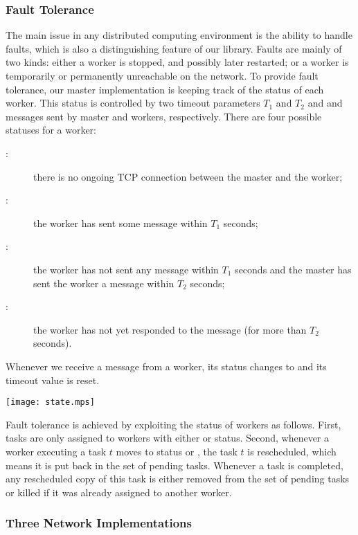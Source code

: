 \documentclass[a4paper,12pt]{article}
\begin{document}
\subsubsection{Fault Tolerance}\label{sec:fault}

The main issue in any distributed computing environment is the ability
to handle faults, which is also a distinguishing feature of our
library.  Faults are mainly of two kinds: either a worker is stopped,
and possibly later restarted; or a worker is temporarily or
permanently unreachable on the network. To provide fault tolerance,
our master implementation is keeping track of the status of each
worker.  This status is controlled by two timeout parameters $T_1$ and
$T_2$ and  and  messages sent by master and workers,
respectively. There are four possible statuses for a worker:
\begin{description}
\item[:] there is no ongoing TCP connection between
  the master and the worker;
\item[:] the worker has sent some message
  within $T_1$ seconds;
\item[:] the worker has not sent any message within $T_1$
  seconds and the master has sent the worker a
   message within $T_2$ seconds;
\item[:] the worker has not yet responded to the 
  message (for more than $T_2$ seconds).
\end{description}
Whenever we receive a message from a worker, its status changes to
 and its timeout value is reset.
\begin{center}
  \texttt{[image: state.mps]}
\end{center}

Fault tolerance is achieved by exploiting the status of workers as
follows. First, tasks are only assigned to workers with either
 or  status. Second, whenever a worker executing
a task $t$ moves to status  or , the
task $t$ is rescheduled, which means it is put back in the set of
pending tasks. Whenever a task is completed, any rescheduled copy of
this task is either removed from the set of pending tasks or killed if
it was already assigned to another worker.

\subsubsection{Three Network Implementations} %
\end{document}
